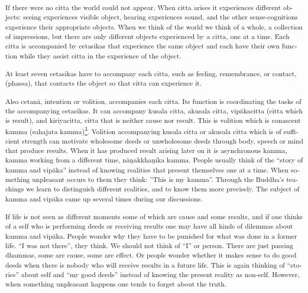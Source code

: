 \textsuperscript{\textdutch{If there were no citta the world could not
appear. When citta arises it experiences different objects: seeing
experiences visible object, hearing experiences sound, and the other
sense-cognitions experience their appropriate objects. When we think of
the world we think of a whole, a collection of impressions, but there
are only different objects experienced by a citta, one at a time. Each
citta is accompanied by cetasikas that experience the same object and
each have their own function while they assist citta in the experience
of the object. }}

\textsuperscript{\textdutch{At least seven cetasikas have to accompany
each citta, such as feeling, remembrance, or contact,(phassa), that
contacts the object so that citta can experience it. }}

\textsuperscript{\textdutch{Also cetanā, intention or volition,
accompanies each citta. Its function is coordinating the tasks of the
accompanying cetasikas. It can accompany kusala citta, akusala citta,
vipākacitta (}\textenglish[variant=american]{citta which is
result}\textdutch{)},\textdutch{ and kiriyacitta, citta that is neither
cause nor result. This is volition which is conascent kamma (sahajata
kamma)\protect\hyperlink{sdfootnote3sym}{\textsuperscript{3}}. Volition
accompanying kusala citta or akusala citta which is of sufficient
strength can motivate wholesome deeds or unwholesome deeds through body,
speech or mind that produce results. When it has produced result arising
later on it is asynchronous kamma, kamma working from a different time,
}n\textitalian{āṇ}akkha\textitalian{ṇ}ika\textdutch{ kamma. People
usually think of the ``story of kamma and vipāka'' instead of knowing
realities that present themselves one at a time. When something
unpleasant occurs to them they think: ''This is my kamma''. Through the
Buddha's teachings we learn to distinguish different realities, and to
know them more precisely. The subject of kamma and vipāka came up
several times during our discussions. }}

\textsuperscript{\textdutch{If life is not seen as different moments
some of which are cause and some results, and if one thinks of a self
who is performing deeds or receiving results one may have all kinds of
dilemmas about kamma and vipāka. People wonder why they have to be
punished for what was done in a former life.
``}\textenglish[variant=american]{I was not
there}\textdutch{''}\textenglish[variant=american]{, they think.
}\textdutch{We should}\textenglish[variant=american]{ not think of
}``I'' or person. \textdutch{There are
j}\textenglish[variant=american]{ust passing dhammas, some are cause,
some are effect.}\textdutch{ Or people wonder whether it makes sense to
do good deeds when there is nobody who will receive results in a future
life. This is again thinking of ``stories'' about self and ``my good
deeds'' instead of knowing the present reality as non-self. However,
when something unpleasant happens one tends to forget about the truth.
}}

